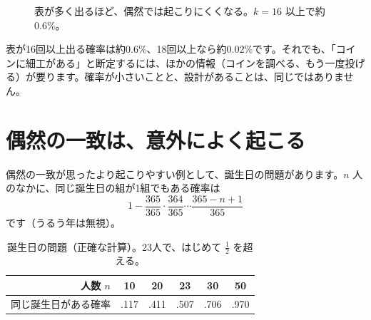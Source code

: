 \documentclass[a4paper,11pt,openany]{ltjsbook}
\begin{document}
\begin{figure}[htbp]
\centering
{}
\caption{表が多く出るほど、偶然では起こりにくくなる。$k=16$ 以上で約0.6\%。}
\end{figure}

表が16回以上出る確率は約0.6\%、18回以上なら約0.02\%です。それでも、「コインに細工がある」と断定するには、ほかの情報（コインを調べる、もう一度投げる）が要ります。確率が小さいことと、設計があることは、同じではありません。

\section{偶然の一致は、意外によく起こる}

偶然の一致が思ったより起こりやすい例として、誕生日の問題があります。$n$ 人のなかに、同じ誕生日の組が1組でもある確率は
\[
1-\frac{365}{365}\cdot\frac{364}{365}\cdots\frac{365-n+1}{365}
\]
です（うるう年は無視）。

\begin{table}[htbp]
\centering
\begin{tabular}{r|ccccc}
\toprule
人数 $n$ & 10 & 20 & 23 & 30 & 50\\
\midrule
同じ誕生日がある確率 & .117 & .411 & .507 & .706 & .970\\
\bottomrule
\end{tabular}
\caption{誕生日の問題（正確な計算）。23人で、はじめて $\tfrac12$ を超える。}
\end{table}
\end{document}

